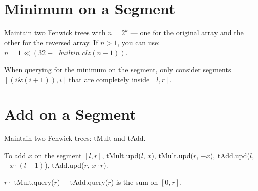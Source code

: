 \section*{Minimum on a Segment}

Maintain two Fenwick trees with $n = 2^k$ — one for the original array and the other for the reversed array. If $n > 1$, you can use:
$n = 1 \ll (32 - \_\_builtin\_clz(n - 1))$.

When querying for the minimum on the segment, only consider segments $[(i \& (i + 1)), i]$ that are completely inside $[l, r]$.

\section*{Add on a Segment}

Maintain two Fenwick trees: tMult and tAdd.

To add $x$ on the segment $[l, r]$, tMult.upd($l$, $x$), tMult.upd($r$, $-x$),
tAdd.upd($l$, $-x \cdot (l - 1)$), tAdd.upd($r$, $x \cdot r$).

$r \cdot$ tMult.query($r$) + tAdd.query($r$) is the sum on $[0, r]$.

